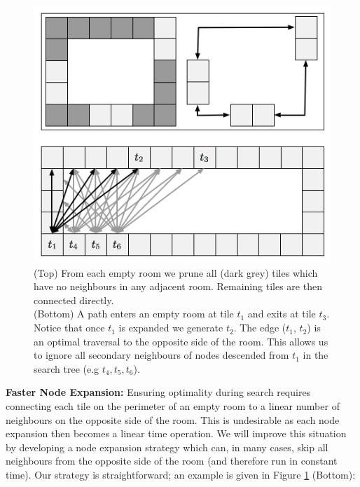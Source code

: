 \begin{figure}[t]
       \begin{center}
                       \includegraphics[scale=0.5, trim = 10mm 10mm 10mm 0mm]{diagrams/branching.png}
       \end{center}
	\vspace{-3pt}
       \caption{(Top) From each empty room we prune all (dark grey) tiles which have no neighbours in any adjacent room. 
Remaining tiles are then connected directly.
\\
		(Bottom) A path enters an empty room at tile $t_{1}$ and exits at tile $t_{3}$. Notice that once
$t_{1}$ is expanded we generate $t_{2}$. The edge ($t_{1}$, $t_{2}$) is an optimal traversal to the opposite side of the room.
This allows us to ignore all secondary neighbours of nodes descended from $t_{1}$ in the search
tree (e.g $t_{4}, t_{5}, t_{6}$).
}
       \label{fig-branching}
\end{figure}

\par \noindent \newline
\textbf{Faster Node Expansion:} 
Ensuring optimality during search requires connecting each tile on the perimeter
of an empty room to a linear number of neighbours on the opposite side of the
room.
This is undesirable as each node expansion then becomes a linear time operation. 
We will improve this situation by developing a node expansion strategy which can, in many cases, skip all neighbours from 
the opposite side of the room (and therefore run in constant time).
Our strategy is straightforward; an example is given in Figure
\ref{fig-branching} (Bottom):

